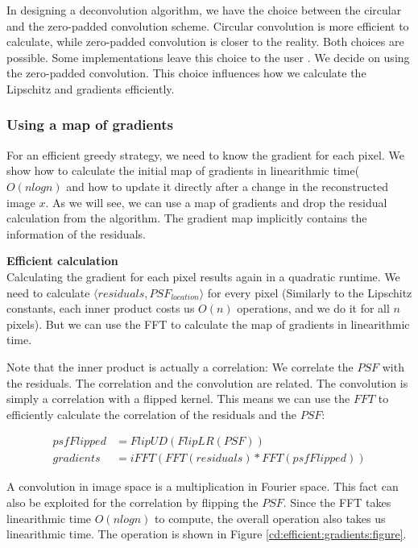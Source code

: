 In designing a deconvolution algorithm, we have the choice between the circular and the zero-padded convolution scheme. Circular convolution is more efficient to calculate, while zero-padded convolution is closer to the reality. Both choices are possible. Some implementations leave this choice to the user \cite{kenyon2019pymoresane}. We decide on using the zero-padded convolution. This choice influences how we calculate the Lipschitz and gradients efficiently.



\subsubsection{Using a map of gradients}
For an efficient greedy strategy, we need to know the gradient for each pixel.  We show how to calculate the initial map of gradients in linearithmic time($O(n log n)$ and how to update it directly after a change in the reconstructed image $x$. As we will see, we can use a map of gradients and drop the residual calculation from the algorithm. The gradient map implicitly contains the information of the residuals.


\textbf{Efficient calculation}\\
Calculating the gradient for each pixel results again in a quadratic runtime. We need to calculate $\langle residuals, PSF_{location} \rangle$ for every pixel (Similarly to the Lipschitz constants, each inner product costs us $O(n)$ operations, and we do it for all $n$ pixels). But we can use the FFT to calculate the map of gradients in linearithmic time.

Note that the inner product is actually a correlation: We correlate the $PSF$ with the residuals. The correlation and the convolution are related. The convolution is simply a correlation with a flipped kernel. This means we can use the $FFT$ to efficiently calculate the correlation of the residuals and the $PSF$:

\begin{equation}\label{cd:efficient:gradients:correlation}
\begin{split}
psfFlipped &= FlipUD(FlipLR(PSF)) \\
gradients &= iFFT(FFT(residuals) * FFT(psfFlipped))
\end{split}
\end{equation}

A convolution in image space is a multiplication in Fourier space. This fact can also be exploited for the correlation by flipping the $PSF$. Since the FFT takes linearithmic time $O(n log n)$ to compute, the overall operation also takes us linearithmic time. The operation is shown in Figure \ref{cd:efficient:gradients:figure}.

